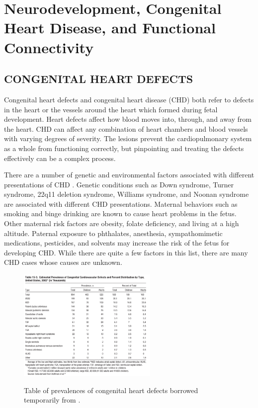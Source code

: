 \chapter{Neurodevelopment, Congenital Heart Disease, and Functional Connectivity}
\label{ch:clinical}

\section{CONGENITAL HEART DEFECTS}

Congenital heart defects and congenital heart disease (CHD) both refer to defects in the heart or the vessels around the heart which formed during  fetal development. Heart defects affect how blood moves into, through, and away from the heart. 
CHD can affect any combination of heart chambers and blood vessels with varying degrees of severity. The lesions prevent the cardiopulmonary system as a whole from functioning correctly, but pinpointing and treating the defects effectively can be a complex process.
 
There are a number of genetic and environmental factors associated with different presentations of CHD \cite{Mozaffarian2016}. Genetic conditions such as Down syndrome, Turner syndrome, 22q11 deletion syndrome, Williams syndrome, and Noonan syndrome are associated with different CHD presentations. Maternal behaviors such as smoking and binge drinking are known to cause heart problems in the fetus. Other maternal risk factors are obesity, folate deficiency, and living at a high altitude. Paternal exposure to phthalates, anesthesia, sympathomimetic medications, pesticides, and solvents may increase the risk of the fetus for developing CHD. While there are quite a few factors in this list, there are many CHD cases whose causes are unknown.

\begin{figure}
\centering
\includegraphics[width=0.6\textwidth]{2/chd-defects-usa.png}
\label{ch2:fig:usa-defects-prev}
\caption{Table of prevalences of congenital heart defects borrowed temporarily from \cite{Mozaffarian2016}.}
\end{figure}


